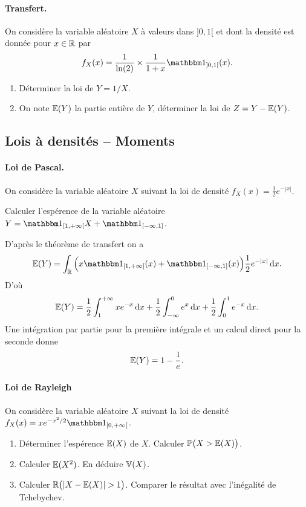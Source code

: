 \documentclass[11pt, a4paper]{article}
\begin{document}
\paragraph{Transfert.} On considère la variable aléatoire $X$ à valeurs
dans $]0, 1[$ et dont la densité est donnée pour $x \in \mathbb{R}$ par
\[
f_X(x) = \frac{1}{\ln(2)}\times \frac{1}{1+x}\bOne_{]0, 1[}(x).
\]
\begin{question}
  \begin{enumerate}
  \item
    Déterminer la loi de $Y = 1/X$.
  \item
    On note $\mathbb{E}(Y)$ la partie entière de $Y$, déterminer la loi de
    $Z = Y - \mathbb{E}(Y)$.
  \end{enumerate}
\end{question}

\subsection{Lois à densités -- Moments}

\paragraph{Loi de Pascal.}
On considère la variable aléatoire $X$ suivant la loi de densité
$f_X(x) =  \frac{1}{2}e^{-|x|}$.
\begin{question}
  Calculer l'espérence de la variable aléatoire
  $Y = \bOne_{[1, +\infty[}X + \bOne_{[-\infty, 1]}$.
\end{question}

\begin{solution}
  D'après le théorème de transfert on a
  \[
  \mbb{E}(Y) = \int_\R \Big(x\bOne_{[1, +\infty[}(x) + \bOne_{[-\infty, 1]}(x)\Big)\frac{1}{2}e^{-|x|}\dd{x}.
  \]
  D'où
  \[
  \mathbb{E}(Y) = \frac{1}{2}\int_1^{+\infty}xe^{-x}\operatorname{d\!}{x} + \frac{1}{2} \int_{-\infty}^0 e^{x}\operatorname{d\!}{x} + \frac{1}{2}\int_{0}^1 e^{-x}\operatorname{d\!}{x}.
  \]
  Une intégration par partie pour la première intégrale et un calcul
  direct pour la seconde donne
  \[
   \mathbb{E}(Y) = 1 - \frac{1}{e}.
  \]
\end{solution}

\paragraph{Loi de Rayleigh}
On considère la variable aléatoire $X$ suivant la loi de densité
$f_X(x) = xe^{-x^2/2}\bOne_{[0, +\infty[}$.
\begin{question}
  \begin{enumerate}
  \item Déterminer l'espérence $\mathbb{E}(X)$ de $X$. Calculer
    $\mathbb{P}\big(X > \mathbb{E}(X)\big)$.
  \item Calculer $\mathbb{E}(X^2)$. En déduire $\mathbb{V}(X)$.
  \item Calculer $\mathbb{R}\big(|X-\mathbb{E}(X)| > 1\big)$. Comparer le
    résultat avec l'inégalité de Tchebychev.
  \end{enumerate}
\end{question}
\end{document}
